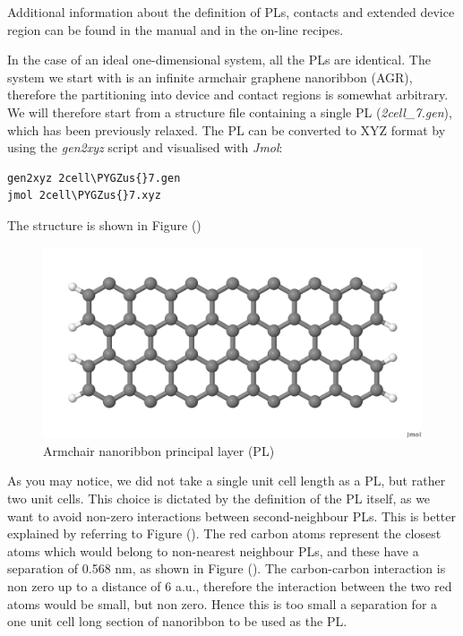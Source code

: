 \documentclass[a4paper,11pt,english]{sphinxmanual}
\def\PYGZus{\char`\_}
\begin{document}
{{Additional information about the definition of PLs, contacts and
extended device region can be found in the manual and in the on-line
recipes.

In the case of an ideal one-dimensional system, all the PLs are
identical. The system we start with is an infinite armchair graphene
nanoribbon (AGR), therefore the partitioning into device and contact
regions is somewhat arbitrary. We will therefore start from a
structure file containing a single PL (\emph{2cell\_7.gen}), which has been
previously relaxed. The PL can be converted to XYZ format by using the
\emph{gen2xyz} script and visualised with \emph{Jmol}:

\begin{Verbatim}[commandchars=\\\{\}]
gen2xyz 2cell\PYGZus{}7.gen
jmol 2cell\PYGZus{}7.xyz
\end{Verbatim}

The structure is shown in Figure {\hyperref[transport:fig-2cell-7]{\emph{}}} ()
\begin{figure}[htbp]
\centering
\capstart

\includegraphics[width=0.600\linewidth]{2cell_7.png}
\caption{Armchair nanoribbon principal layer (PL)}\label{transport:fig-2cell-7}\end{figure}

As you may notice, we did not take a single unit cell length as a PL,
but rather two unit cells. This choice is dictated by the definition
of the PL itself, as we want to avoid non-zero interactions between
second-neighbour PLs. This is better explained by referring to Figure
{\hyperref[transport:fig-4cell-7]{\emph{}}} (). The red carbon atoms represent the closest atoms
which would belong to non-nearest neighbour PLs, and these have a
separation of 0.568 nm, as shown in Figure {\hyperref[transport:fig-4cell-7]{\emph{}}} (). The
carbon-carbon interaction is non zero up to a distance of 6 a.u.,
therefore the interaction between the two red atoms would be small,
but non zero. Hence this is too small a separation for a one unit cell
long section of nanoribbon to be used as the PL.
\begin{figure}[htbp]
\centering
\capstart


\end{figure}}}
\end{document}
